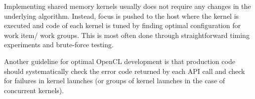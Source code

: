 Implementing shared memory kernels usually does not require any changes in the underlying algorithm. Instead, focus is pushed to the host where the kernel is executed and code of each kernel is tuned by finding optimal configuration for work item/ work groups. This is most often done through straightforward timing experiments and brute-force testing.

Another guideline for optimal OpenCL development is that production code should systematically check the error code returned by each API call and check for failures in kernel launches (or groups of kernel launches in the case of concurrent kernels). 